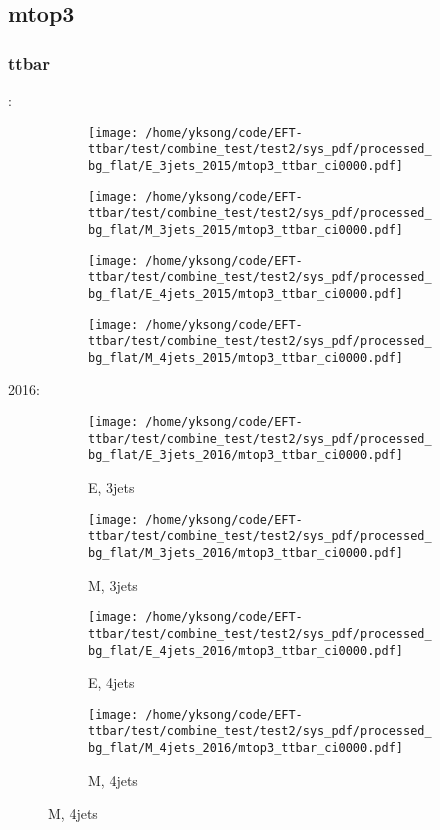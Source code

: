 \documentclass{beamer}
\begin{document}
\subsection{mtop3}

\begin{frame}
\frametitle{ttbar}
\fontsize{5}{1}:
\begin{figure}
\centering
\begin{subfigure}[b]{0.24\textwidth}
\texttt{[image: /home/yksong/code/EFT-ttbar/test/combine\_test/test2/sys\_pdf/processed\_bg\_flat/E\_3jets\_2015/mtop3\_ttbar\_ci0000.pdf]}
\end{subfigure}
\begin{subfigure}[b]{0.24\textwidth}
\texttt{[image: /home/yksong/code/EFT-ttbar/test/combine\_test/test2/sys\_pdf/processed\_bg\_flat/M\_3jets\_2015/mtop3\_ttbar\_ci0000.pdf]}
\end{subfigure}
\begin{subfigure}[b]{0.24\textwidth}
\texttt{[image: /home/yksong/code/EFT-ttbar/test/combine\_test/test2/sys\_pdf/processed\_bg\_flat/E\_4jets\_2015/mtop3\_ttbar\_ci0000.pdf]}
\end{subfigure}
\begin{subfigure}[b]{0.24\textwidth}
\texttt{[image: /home/yksong/code/EFT-ttbar/test/combine\_test/test2/sys\_pdf/processed\_bg\_flat/M\_4jets\_2015/mtop3\_ttbar\_ci0000.pdf]}
\end{subfigure}
\end{figure}
2016:
\begin{figure}
\centering
\begin{subfigure}[b]{0.24\textwidth}
\texttt{[image: /home/yksong/code/EFT-ttbar/test/combine\_test/test2/sys\_pdf/processed\_bg\_flat/E\_3jets\_2016/mtop3\_ttbar\_ci0000.pdf]}
\captionsetup{font=tiny}
\caption{E, 3jets}
\end{subfigure}
\begin{subfigure}[b]{0.24\textwidth}
\texttt{[image: /home/yksong/code/EFT-ttbar/test/combine\_test/test2/sys\_pdf/processed\_bg\_flat/M\_3jets\_2016/mtop3\_ttbar\_ci0000.pdf]}
\captionsetup{font=tiny}
\caption{M, 3jets}
\end{subfigure}
\begin{subfigure}[b]{0.24\textwidth}
\texttt{[image: /home/yksong/code/EFT-ttbar/test/combine\_test/test2/sys\_pdf/processed\_bg\_flat/E\_4jets\_2016/mtop3\_ttbar\_ci0000.pdf]}
\captionsetup{font=tiny}
\caption{E, 4jets}
\end{subfigure}
\begin{subfigure}[b]{0.24\textwidth}
\texttt{[image: /home/yksong/code/EFT-ttbar/test/combine\_test/test2/sys\_pdf/processed\_bg\_flat/M\_4jets\_2016/mtop3\_ttbar\_ci0000.pdf]}
\captionsetup{font=tiny}
\caption{M, 4jets}
\end{subfigure}
\end{figure}
\end{frame}
\end{document}
